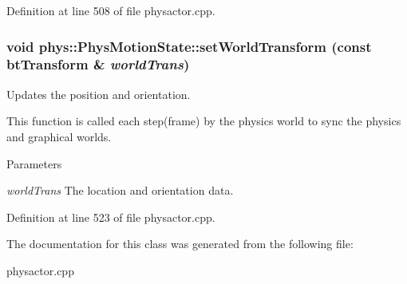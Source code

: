 Definition at line 508 of file physactor.cpp.

\hypertarget{classphys_1_1PhysMotionState_a91e372f8f474bb570e502ee42ec2deeb}{
\subsubsection[{setWorldTransform}]{\setlength{\rightskip}{0pt plus 5cm}void phys::PhysMotionState::setWorldTransform (const btTransform \& {\em worldTrans})}}
\label{dc/d0d/classphys_1_1PhysMotionState_a91e372f8f474bb570e502ee42ec2deeb}


Updates the position and orientation. 

This function is called each step(frame) by the physics world to sync the physics and graphical worlds. 
\begin{DoxyParams}{Parameters}
\item[{\em worldTrans}]The location and orientation data. \end{DoxyParams}


Definition at line 523 of file physactor.cpp.



The documentation for this class was generated from the following file:\begin{DoxyCompactItemize}
\item 
physactor.cpp\end{DoxyCompactItemize}
